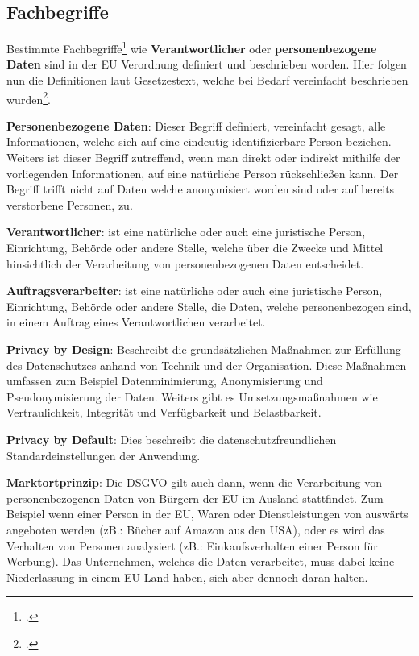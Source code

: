 \subsection{Fachbegriffe}
Bestimmte Fachbegriffe\footcite{Lehrunterlagen-HTL-cloud} wie \textbf{Verantwortlicher} oder \textbf{personenbezogene Daten} sind in der EU Verordnung definiert und beschrieben worden. Hier folgen nun die Definitionen laut Gesetzestext, welche bei Bedarf vereinfacht beschrieben wurden\footcite{mehr-dsgvo}. 

\textbf{Personenbezogene Daten}: Dieser Begriff definiert, vereinfacht gesagt, alle Informationen, welche sich auf eine eindeutig identifizierbare Person beziehen. Weiters ist dieser Begriff zutreffend, wenn man direkt oder indirekt mithilfe der vorliegenden Informationen, auf eine natürliche Person rückschließen kann.
Der Begriff trifft nicht auf Daten welche anonymisiert worden sind oder auf bereits verstorbene Personen, zu.

\textbf{Verantwortlicher}: ist eine natürliche oder auch eine juristische Person, Einrichtung, Behörde oder andere Stelle, welche über die Zwecke und Mittel hinsichtlich der Verarbeitung von personenbezogenen Daten entscheidet.

\textbf{Auftragsverarbeiter}: ist eine natürliche oder auch eine juristische Person, Einrichtung, Behörde oder andere Stelle, die Daten, welche personenbezogen sind, in einem Auftrag eines Verantwortlichen verarbeitet.

\textbf{Privacy by Design}: Beschreibt die grundsätzlichen Maßnahmen zur Erfüllung des Datenschutzes anhand von Technik und der Organisation. Diese Maßnahmen umfassen zum Beispiel Datenminimierung, Anonymisierung und Pseudonymisierung der Daten. Weiters gibt es Umsetzungsmaßnahmen wie Vertraulichkeit, Integrität und Verfügbarkeit und Belastbarkeit.

\textbf{Privacy by Default}: Dies beschreibt die datenschutzfreundlichen Standardeinstellungen der Anwendung.

\textbf{Marktortprinzip}: Die DSGVO gilt auch dann, wenn die Verarbeitung von personenbezogenen Daten von Bürgern der EU im Ausland stattfindet.
Zum Beispiel wenn einer Person in der EU, Waren oder Dienstleistungen von auswärts angeboten werden (zB.: Bücher auf Amazon aus den USA), oder es wird das Verhalten von Personen
analysiert (zB.: Einkaufsverhalten einer Person für Werbung). Das Unternehmen, welches die Daten verarbeitet, muss dabei keine Niederlassung in einem EU-Land haben, sich aber dennoch daran halten.

